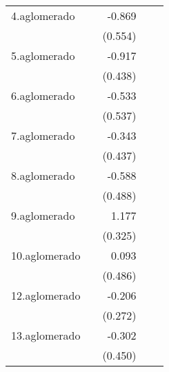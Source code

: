 {\begin{longtable}{l*{4}{D{.}{.}{-1}}}
\addlinespace
4.aglomerado&                     &      -0.869         &                     &                     \\
            &                     &     (0.554)         &                     &                     \\
\addlinespace
5.aglomerado&                     &      -0.917\sym{*}  &                     &                     \\
            &                     &     (0.438)         &                     &                     \\
\addlinespace
6.aglomerado&                     &      -0.533         &                     &                     \\
            &                     &     (0.537)         &                     &                     \\
\addlinespace
7.aglomerado&                     &      -0.343         &                     &                     \\
            &                     &     (0.437)         &                     &                     \\
\addlinespace
8.aglomerado&                     &      -0.588         &                     &                     \\
            &                     &     (0.488)         &                     &                     \\
\addlinespace
9.aglomerado&                     &       1.177\sym{***}&                     &                     \\
            &                     &     (0.325)         &                     &                     \\
\addlinespace
10.aglomerado&                     &       0.093         &                     &                     \\
            &                     &     (0.486)         &                     &                     \\
\addlinespace
12.aglomerado&                     &      -0.206         &                     &                     \\
            &                     &     (0.272)         &                     &                     \\
\addlinespace
13.aglomerado&                     &      -0.302         &                     &                     \\
            &                     &     (0.450)         &                     &                     \\

\end{longtable}}
